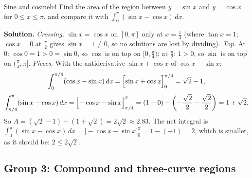\documentclass[11pt]{article}
\begin{document}
\begin{exmp}{Sine and cosine}{b4}
Find the area of the region between $y=\sin x$ and $y=\cos x$ for $0\le x\le\pi$, and compare it with $\int_0^\pi(\sin x-\cos x)\,dx$.

\textbf{Solution.} \emph{Crossing.} $\sin x=\cos x$ on $[0,\pi]$ only at $x=\frac\pi4$ (where $\tan x=1$; $\cos x=0$ at $\frac\pi2$ gives $\sin x=1\ne0$, so no solutions are lost by dividing). \emph{Top.} At $0$: $\cos0=1>0=\sin0$, so $\cos$ is on top on $[0,\frac\pi4)$; at $\frac\pi2$: $1>0$, so $\sin$ is on top on $(\frac\pi4,\pi]$.
\emph{Pieces.} With the antiderivative $\sin x+\cos x$ of $\cos x-\sin x$:
\[
\int_0^{\pi/4}(\cos x-\sin x)\,dx=\Bigl[\sin x+\cos x\Bigr]_0^{\pi/4}=\sqrt2-1,
\]
\[
\int_{\pi/4}^{\pi}(\sin x-\cos x)\,dx=\Bigl[-\cos x-\sin x\Bigr]_{\pi/4}^{\pi}=(1-0)-\left(-\frac{\sqrt2}2-\frac{\sqrt2}2\right)=1+\sqrt2 .
\]
So $A=(\sqrt2-1)+(1+\sqrt2)=2\sqrt2\approx2.83$. The net integral is $\int_0^\pi(\sin x-\cos x)\,dx=\bigl[-\cos x-\sin x\bigr]_0^\pi=1-(-1)=2$, which is smaller, as it should be: $2\le2\sqrt2$.
\end{exmp}

\subsection*{Group 3: Compound and three-curve regions}
\end{document}
